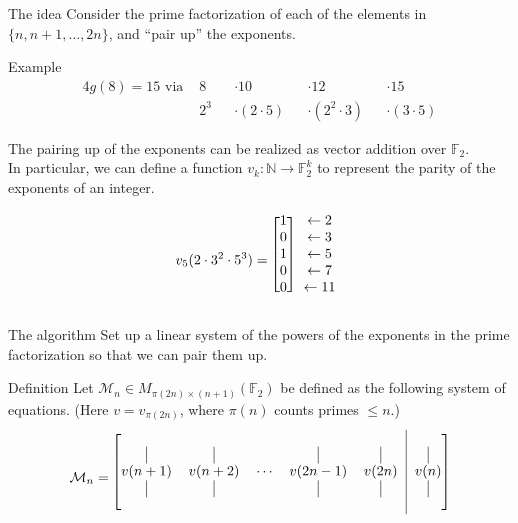 \documentclass{beamer}
\begin{document}
\begin{frame}{The idea}
  Consider the prime factorization of each of the elements in
  $\{n, n+1, \hdots, 2n\}$,
  and ``pair up'' the exponents.\\
  \begin{block}{Example}
    \setlength\abovedisplayskip{-10pt}
    \begin{alignat*}{4}
      g(8) = 15 \text{ via } &8   && \cdot 10          && \cdot 12            && \cdot 15 \\
                             &2^3 && \cdot (2 \cdot 5) && \cdot (2^2 \cdot 3) && \cdot (3 \cdot 5)
    \end{alignat*}
  \end{block}
  The pairing up of the exponents can be realized as vector addition over
  $\mathbb{F}_2$. \\
  In particular, we can define a function $v_k: \mathbb{N} \to \mathbb{F}_2^k$ to represent the
  parity of the exponents of an integer.

  \[
    v_5(2 \cdot 3^2 \cdot 5^3) =
    \begin{blockarray}{cc}
      \begin{block}{[c]c}
        1 & \leftarrow 2 \\
        0 & \leftarrow 3 \\
        1 & \leftarrow 5 \\
        0 & \leftarrow 7 \\
        0 & \leftarrow 11 \\
      \end{block}
    \end{blockarray}
  \]
\end{frame}

\begin{frame}{The algorithm}
  Set up a linear system of the powers of the exponents in the prime
  factorization so that we can pair them up.
  \begin{block}{Definition}
    Let $\mathcal{M}_n \in M_{\pi(2n)\times (n + 1)}(\mathbb{F}_2)$ be defined as
    the following system of equations. (Here $v = v_{\pi(2n)}$, where $\pi(n)$
    counts primes $\leq n$.)
    \[
      \mathcal{M}_n =
      \begin{blockarray}{cccccc}
      \begin{block}{[ccccc|c]}
        & & & & & \\
        \vrule   & \vrule   &        & \vrule    & \vrule & \vrule \\
        v(n + 1) & v(n + 2) & \cdots & v(2n - 1) & v(2n)  & v(n) \\
        \vrule   & \vrule   &        & \vrule    & \vrule & \vrule \\
        & & & & & \\
      \end{block}
      \end{blockarray}
    \]
  \end{block}
\end{frame}
\end{document}
